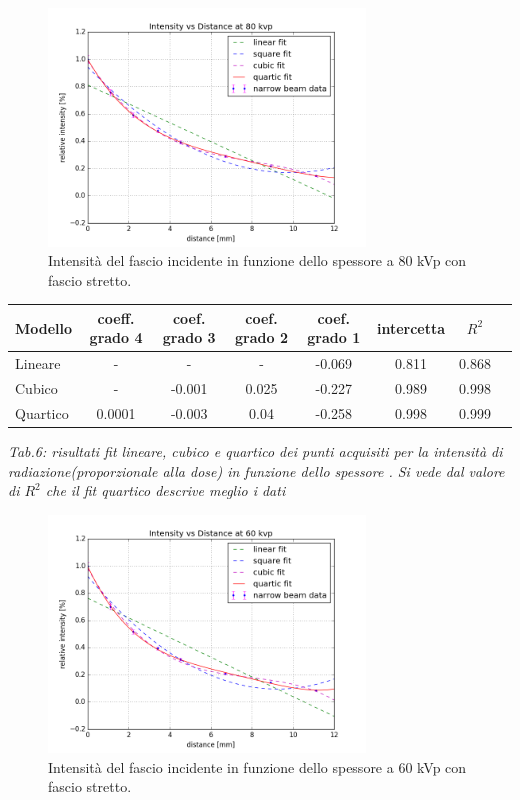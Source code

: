 \documentclass[a4paper]{article}
\begin{document}
\begin{figure}[H]
\centering
\includegraphics[width=0.75\textwidth]{hvl80pvk.png}
\caption{Intensità del fascio incidente in funzione dello spessore a 80 kVp con fascio stretto.}
\end{figure}

\begin{center} 
		
		\begin{tabular}{lccccccc}
			\hline
			\hline
			\textbf{Modello}	& \textbf{coeff. grado 4}&\textbf{coef. grado 3}&\textbf{coef. grado 2}& \textbf{coef. grado 1}& \textbf{intercetta}&  \textbf{$R^{2}$} 	 \\
			\hline
			\hline
			Lineare	&-&-&-&-0.069&0.811&0.868	\\
			Cubico	&-&-0.001&0.025&-0.227&0.989&0.998\\
			Quartico &0.0001&-0.003&0.04&-0.258&0.998&0.999\\
			
			\hline
			\hline
		\end{tabular}
		\linebreak
		\emph{Tab.6: risultati fit lineare, cubico e quartico  dei punti acquisiti per la intensità di radiazione(proporzionale alla dose) in funzione dello spessore . Si vede dal valore di $R^{2}$ che il fit quartico descrive meglio i dati} 
	\end{center} 


\begin{figure}[H]
\centering
\includegraphics[width=0.75\textwidth]{hvl60pvk.png}
\caption{Intensità del fascio incidente in funzione dello spessore a 60 kVp con fascio stretto.}
\end{figure}
\end{document}
